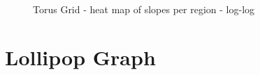  \begin{figure}[h]
     \centering
     \caption{Torus Grid - heat map of slopes per region - log-log}
     \label{fig:torusgraphslopes}
 \end{figure}

 \section{Lollipop Graph}\label{sec:lollipopgraph}
